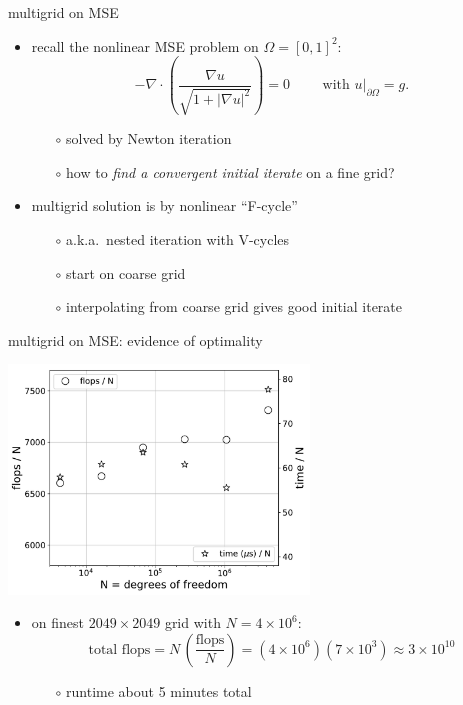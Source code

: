\documentclass[hide notes,intlimits,usenames,dvipsnames]{beamer}
\newcommand{\grad}{\nabla}
\begin{document}
\begin{frame}{multigrid on MSE}
\begin{itemize}
\item recall the nonlinear MSE problem on $\Omega=[0,1]^2$:
\small
    $$- \grad\cdot \left(\frac{\grad u}{\sqrt{1 + |\grad u|^2}}\right) = 0  \qquad \text{ with } u\big|_{\partial \Omega} = g.$$
\normalsize
    \vspace{-3mm}
    \begin{itemize}
    \item[$\circ$] solved by Newton iteration
    \item[$\circ$] how to \emph{find a convergent initial iterate} on a fine grid?
    \end{itemize}
\item multigrid solution is by nonlinear ``F-cycle''
    \begin{itemize}
    \item[$\circ$] a.k.a.~nested iteration with V-cycles
    \item[$\circ$] start on coarse grid
    \item[$\circ$] interpolating from coarse grid gives good initial iterate
    \end{itemize}
\end{itemize}

\begin{center}
\begin{tikzpicture}[scale=1.0]

\end{tikzpicture}
\end{center}
\end{frame}


\begin{frame}{multigrid on MSE: evidence of optimality}

\begin{center}
\includegraphics[width=0.6\textwidth]{figs/minoptimal}
\end{center}
\begin{itemize}
\item on finest $2049\times 2049$ grid with $N=4\times 10^6$:
    $$\text{total flops} = N \, \left(\frac{\text{flops}}{N}\right) = (4\times 10^6) (7 \times 10^3) \approx 3 \times 10^{10}$$
    \vspace{-3mm}
    \begin{itemize}
    \item[$\circ$] runtime about 5 minutes total
    \end{itemize}
\end{itemize}
\end{frame}
\end{document}
